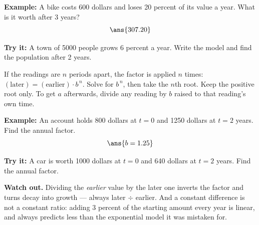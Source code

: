 \documentclass[12pt]{article}
\begin{document}
\begin{examplebox}
\textbf{Example:} A bike costs 600 dollars and loses 20 percent of its value a
year. What is it worth after 3 years?
\[ \ans{307.20} \]
\end{examplebox}

\begin{tryitbox}
\textbf{Try it:} A town of 5000 people grows 6 percent a year. Write the model
and find the population after 2 years.

\end{tryitbox}


\begin{formulabox}
If the readings are $n$ periods apart, the factor is applied $n$ times:
$(\text{later}) = (\text{earlier})\cdot b^{\,n}$. Solve for $b^{\,n}$, then take
the $n$th root. Keep the positive root only. To get $a$ afterwards, divide any
reading by $b$ raised to that reading's own time.
\end{formulabox}

\begin{examplebox}
\textbf{Example:} An account holds 800 dollars at $t = 0$ and 1250 dollars at
$t = 2$ years. Find the annual factor.
\[ \ans{b = 1.25} \]
\end{examplebox}

\begin{tryitbox}
\textbf{Try it:} A car is worth 1000 dollars at $t = 0$ and 640 dollars at
$t = 2$ years. Find the annual factor.

\end{tryitbox}

\begin{watchoutbox}
\textbf{Watch out.} Dividing the \emph{earlier} value by the later one inverts
the factor and turns decay into growth --- always later $\div$ earlier. And a
constant difference is not a constant ratio: adding 3 percent of the starting
amount every year is linear, and always predicts less than the exponential model
it was mistaken for.
\end{watchoutbox}
\end{document}
